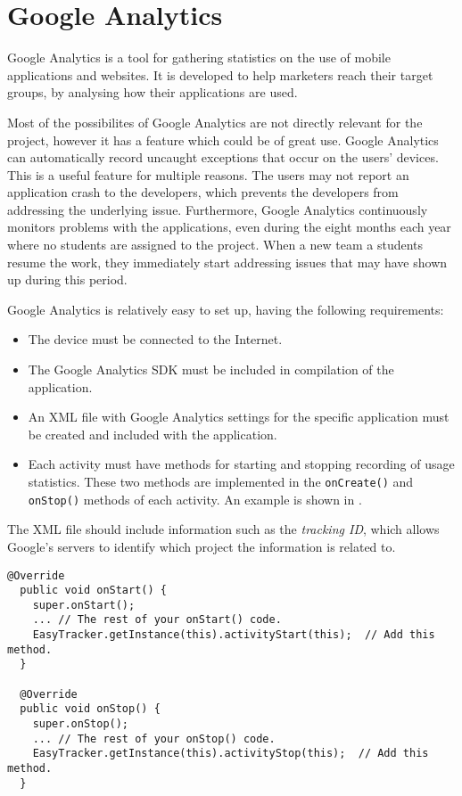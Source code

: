\section{Google Analytics}

Google Analytics is a tool for gathering statistics on the use of mobile applications and websites. 
It is developed to help marketers reach their target groups, by analysing how their applications are used.

Most of the possibilites of Google Analytics are not directly relevant for the \giraf project, however it has a feature which could be of great use.
Google Analytics can automatically record uncaught exceptions that occur on the users' devices.
This is a useful feature for multiple reasons. The users may not report an application crash to the developers, which prevents the developers from addressing the underlying issue. Furthermore, Google Analytics continuously monitors problems with the applications, even during the eight months each year where no students are assigned to the project. When a new team a students resume the work, they immediately start addressing issues that may have shown up during this period.

Google Analytics is relatively easy to set up, having the following requirements:
\begin{itemize}
\item The device must be connected to the Internet.
\item The Google Analytics SDK must be included in compilation of the application.
\item An XML file with Google Analytics settings for the specific application must be created and included with the application.
\item Each activity must have methods for starting and stopping recording of usage statistics. These two methods are implemented in the \lstinline{onCreate()} and \lstinline{onStop()} methods of each activity. An example is shown in .
\end{itemize}
The XML file should include information such as the \textit{tracking ID}, which allows Google's servers to identify which project the information is related to.

\begin{lstlisting}[caption={The code that needs to be added to \lstinline{OnCreate()} and \lstinline{OnStop()} methods.}, label={lst:googleanalystics}]
  @Override
  public void onStart() {
    super.onStart();
    ... // The rest of your onStart() code.
    EasyTracker.getInstance(this).activityStart(this);  // Add this method.
  }

  @Override
  public void onStop() {
    super.onStop();
    ... // The rest of your onStop() code.
    EasyTracker.getInstance(this).activityStop(this);  // Add this method.
  }
\end{lstlisting}

